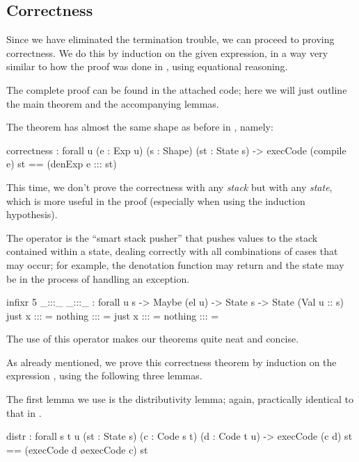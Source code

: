 \subsection{Correctness}

Since we have eliminated the termination trouble, we can proceed to proving
correctness. We do this by induction on the given expression, in a way
very similar to how the proof was done in , using
equational reasoning.

The complete proof can be found
in the attached code; here we will just outline the main theorem and the
accompanying lemmas.

The theorem has almost the same shape as before in ,
namely:
\begin{code}
  correctness : forall {u} (e : Exp u) (s : Shape) (st : State s)
    -> execCode (compile e) st == (denExp e ::: st)
\end{code}\label{sec:hau-correctness}

\noindent This time, we don't prove the correctness with any \emph{stack} but
with any \emph{state}, which is more useful in the proof (especially when
using the induction hypothesis).

The operator \ident{:::} is the ``smart stack pusher'' that pushes values
to the stack contained within a state, dealing correctly with all combinations
of cases that may occur; for example, the denotation function 
may return  and the state  may be in the process
of handling an exception.

\begin{codei}
  infixr 5 _:::_
  _:::_ : forall {u s} -> Maybe (el u) -> State s -> State (Val u :: s)
  just x	:::	\tick[ st ]		= \tick[ x \scons st ]
  nothing	:::	\tick[ st ]		= 
  just x	:::	\x[ n , st ]	= \x[ n , st ]
  nothing	:::	\x[ n , st ]	= \x[ n , st ]
\end{codei}

\noindent The use of this operator makes our theorems quite neat and concise.

As already mentioned, we prove this correctness theorem by induction on the
expression , using the following three lemmas.

The first lemma we use is the distributivity lemma; again, practically
identical to that in .
\begin{code}
  distr : forall {s t u} (st : State s) (c : Code s t) (d : Code t u)
    -> execCode (c \app d) st == (execCode d \o execCode c) st
\end{code}

